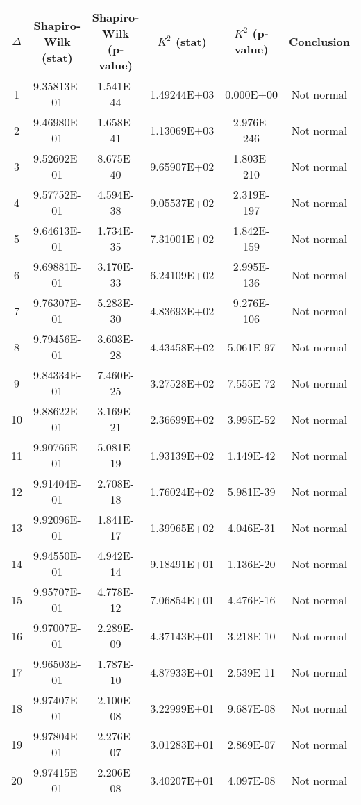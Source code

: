 \begin{table}[h]
	\begin{tabular}{|c|c|c|c|c|c|}
		\hline
		$\Delta$ &  Shapiro-Wilk (stat) & Shapiro-Wilk (p-value) & $K^2$ (stat) & $K^2$ (p-value) & Conclusion\\\hline
		\hline
		1 & 9.35813E-01 & 1.541E-44 & 1.49244E+03 & 0.000E+00 & Not normal\\\hline
		2 & 9.46980E-01 & 1.658E-41 & 1.13069E+03 & 2.976E-246 & Not normal\\\hline
		3 & 9.52602E-01 & 8.675E-40 & 9.65907E+02 & 1.803E-210 & Not normal\\\hline
		4 & 9.57752E-01 & 4.594E-38 & 9.05537E+02 & 2.319E-197 & Not normal\\\hline
		5 & 9.64613E-01 & 1.734E-35 & 7.31001E+02 & 1.842E-159 & Not normal\\\hline
		6 & 9.69881E-01 & 3.170E-33 & 6.24109E+02 & 2.995E-136 & Not normal\\\hline
		7 & 9.76307E-01 & 5.283E-30 & 4.83693E+02 & 9.276E-106 & Not normal\\\hline
		8 & 9.79456E-01 & 3.603E-28 & 4.43458E+02 & 5.061E-97 & Not normal\\\hline
		9 & 9.84334E-01 & 7.460E-25 & 3.27528E+02 & 7.555E-72 & Not normal\\\hline
		10 & 9.88622E-01 & 3.169E-21 & 2.36699E+02 & 3.995E-52 & Not normal\\\hline
		11 & 9.90766E-01 & 5.081E-19 & 1.93139E+02 & 1.149E-42 & Not normal\\\hline
		12 & 9.91404E-01 & 2.708E-18 & 1.76024E+02 & 5.981E-39 & Not normal\\\hline
		13 & 9.92096E-01 & 1.841E-17 & 1.39965E+02 & 4.046E-31 & Not normal\\\hline
		14 & 9.94550E-01 & 4.942E-14 & 9.18491E+01 & 1.136E-20 & Not normal\\\hline
		15 & 9.95707E-01 & 4.778E-12 & 7.06854E+01 & 4.476E-16 & Not normal\\\hline
		16 & 9.97007E-01 & 2.289E-09 & 4.37143E+01 & 3.218E-10 & Not normal\\\hline
		17 & 9.96503E-01 & 1.787E-10 & 4.87933E+01 & 2.539E-11 & Not normal\\\hline
		18 & 9.97407E-01 & 2.100E-08 & 3.22999E+01 & 9.687E-08 & Not normal\\\hline
		19 & 9.97804E-01 & 2.276E-07 & 3.01283E+01 & 2.869E-07 & Not normal\\\hline
		20 & 9.97415E-01 & 2.206E-08 & 3.40207E+01 & 4.097E-08 & Not normal\\\hline

\end{tabular}
\end{table}
